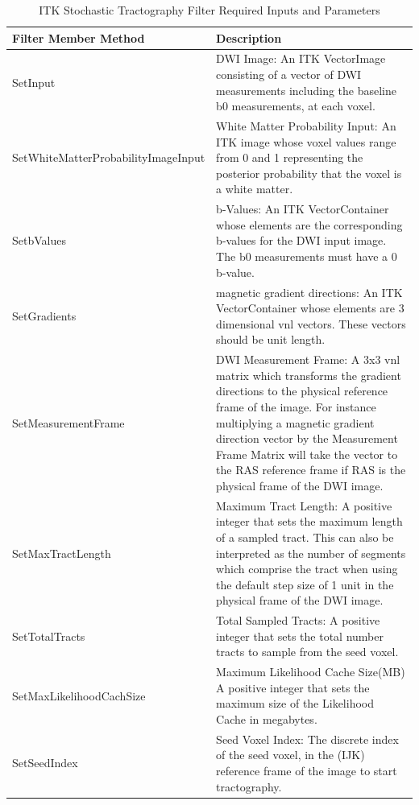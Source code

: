 \documentclass{InsightArticle}
\begin{document}
\begin{table}
  \center
  \begin{tabular}{| l | p{8cm} |}
    \hline 
    \textbf{Filter Member Method} & \textbf{Description}\\
    \hline
    \small{SetInput} & DWI Image: An ITK VectorImage consisting of a vector of DWI measurements including the baseline b0 measurements, at each voxel. \\
    \hline
    \small{SetWhiteMatterProbabilityImageInput} & White Matter Probability Input: An ITK image whose voxel values range from 0 and 1 representing the posterior probability that the voxel is a white matter.  \\
    \hline
    \small{SetbValues} &  b-Values: An ITK VectorContainer whose elements are the corresponding b-values for the DWI input image.  The b0 measurements must have a 0 b-value. \\
    \hline
    \small{SetGradients} & magnetic gradient directions: An ITK VectorContainer whose elements are 3 dimensional vnl vectors.  These vectors should be unit length.\\
    \hline
    \small{SetMeasurementFrame} & DWI Measurement Frame: A 3x3 vnl matrix which transforms the gradient directions to the physical reference frame of the image.  For instance multiplying a magnetic gradient direction vector by the Measurement Frame Matrix will take the vector to the RAS reference frame if RAS is the physical frame of the DWI image. \\
    \hline
    \small{SetMaxTractLength} & Maximum Tract Length: A positive integer that sets the maximum length of a sampled tract.  This can also be interpreted as the number of segments which comprise the tract when using the default step size of 1 unit in the physical frame of the DWI image. \\
    \hline
    \small{SetTotalTracts} & Total Sampled Tracts: A positive integer that sets the total number tracts to sample from the seed voxel. \\
    \hline
    \small{SetMaxLikelihoodCachSize} & Maximum Likelihood Cache Size(MB) A positive integer that sets the maximum size of the Likelihood Cache in megabytes.\\
    \hline
    \small{SetSeedIndex} & Seed Voxel Index:  The discrete index of the seed voxel, in the (IJK) reference frame of the image to start tractography.\\
    \hline
  \end{tabular}
  \caption{ITK Stochastic Tractography Filter Required Inputs and Parameters}
  \label{tab:filterinputs}
\end{table}
\end{document}
